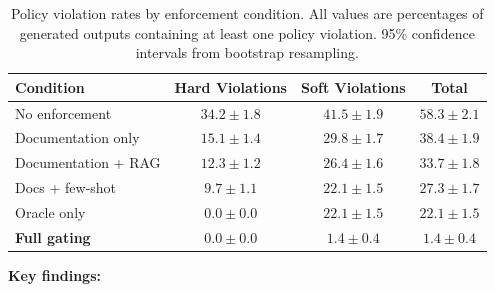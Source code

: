 \documentclass[11pt,a4paper]{article}
\begin{document}
\begin{table}[t]
\centering
\caption{Policy violation rates by enforcement condition.  All values
are percentages of generated outputs containing at least one policy
violation.  95\% confidence intervals from bootstrap resampling.}
\label{tab:results}
\begin{tabular}{@{}lccc@{}}
\toprule
\textbf{Condition} & \textbf{Hard Violations} & \textbf{Soft Violations} & \textbf{Total} \\
\midrule
No enforcement       & $34.2 \pm 1.8$ & $41.5 \pm 1.9$ & $58.3 \pm 2.1$ \\
Documentation only   & $15.1 \pm 1.4$ & $29.8 \pm 1.7$ & $38.4 \pm 1.9$ \\
Documentation + RAG  & $12.3 \pm 1.2$ & $26.4 \pm 1.6$ & $33.7 \pm 1.8$ \\
Docs + few-shot      & $9.7 \pm 1.1$  & $22.1 \pm 1.5$ & $27.3 \pm 1.7$ \\
Oracle only          & $0.0 \pm 0.0$  & $22.1 \pm 1.5$ & $22.1 \pm 1.5$ \\
\textbf{Full gating} & $\mathbf{0.0 \pm 0.0}$ & $\mathbf{1.4 \pm 0.4}$ & $\mathbf{1.4 \pm 0.4}$ \\
\bottomrule
\end{tabular}
\end{table}

\textbf{Key findings:}
\end{document}
